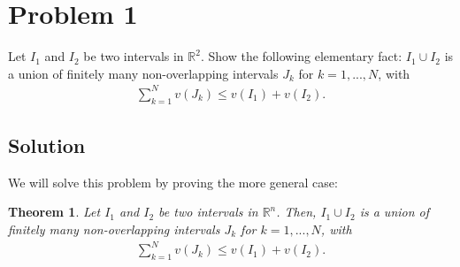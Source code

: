 \documentclass[10pt,a4paper]{article}
\author{Jeremiah Givens}
\theoremstyle{theorem}
\newtheorem{theorem}{Theorem}
\theoremstyle{definition}
\begin{document}
\section*{Problem 1}
Let $I_1$ and $I_2$ be two intervals in $\mathbb{R}^2$. Show the following elementary fact: $I_1 \cup I_2$ is a union of finitely many non-overlapping intervals $J_k$ for $k = 1,...,N$, with 
\begin{align*}
\sum_{k=1}^N v(J_k) \leq v(I_1) + v(I_2).
\end{align*}
\subsection*{Solution}
We will solve this problem by proving the more general case:
\begin{theorem}
Let $I_1$ and $I_2$ be two intervals in $\mathbb{R}^n$. Then, $I_1 \cup I_2$ is a union of finitely many non-overlapping intervals $J_k$ for $k = 1,...,N$, with 
\begin{align*}
\sum_{k=1}^N v(J_k) \leq v(I_1) + v(I_2).
\end{align*}
\end{theorem}
\end{document}
